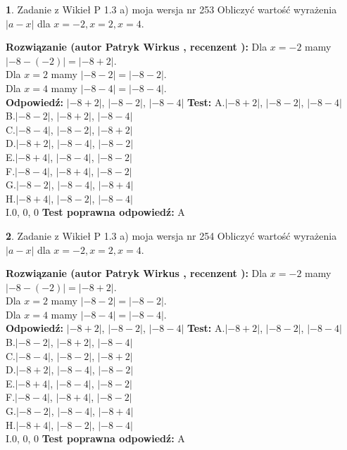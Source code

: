 \documentclass[12pt, a4paper]{article}
\theoremstyle{definition} %
\newtheorem{zad}{}
\newcommand{\zadStart}[1]{\begin{zad}#1\newline}
\newcommand{\zadStop}{\end{zad}}
\newcommand{\rozwStart}[2]{\noindent \textbf{Rozwiązanie (autor #1 , recenzent #2): }\newline}
\newcommand{\rozwStop}{\newline}
\newcommand{\odpStart}{\noindent \textbf{Odpowiedź:}\newline}
\newcommand{\odpStop}{\newline}
\newcommand{\testStart}{\noindent \textbf{Test:}\newline}
\newcommand{\testStop}{\newline}
\newcommand{\kluczStart}{\noindent \textbf{Test poprawna odpowiedź:}\newline}
\newcommand{\kluczStop}{\newline}
\begin{document}
\zadStart{Zadanie z Wikieł P 1.3 a) moja wersja nr 253}
Obliczyć wartość wyrażenia $|a - x|$ dla $x=-2,x=2,x=4$.
\zadStop
\rozwStart{Patryk Wirkus}{}
Dla $x = -2$ mamy $|-8 - (-2)| = |-8 + 2|$.\\
Dla $x = 2$ mamy $|-8 - 2| = |-8 - 2|$.\\
Dla $x = 4$ mamy $|-8 - 4| = |-8 - 4|$.\\
\rozwStop
\odpStart
$|-8 + 2|$, $|-8 - 2|$, $|-8 - 4|$
\odpStop
\testStart
A.$|-8 + 2|$, $|-8 - 2|$, $|-8 - 4|$\\
B.$|-8 - 2|$, $|-8 + 2|$, $|-8 - 4|$\\
C.$|-8 - 4|$, $|-8 - 2|$, $|-8 + 2|$\\
D.$|-8 + 2|$, $|-8 - 4|$, $|-8 - 2|$\\
E.$|-8 + 4|$, $|-8 - 4|$, $|-8 - 2|$\\
F.$|-8 - 4|$, $|-8 + 4|$, $|-8 - 2|$\\
G.$|-8 - 2|$, $|-8 - 4|$, $|-8 + 4|$\\
H.$|-8 + 4|$, $|-8 - 2|$, $|-8 - 4|$\\
I.$0$, $0$, $0$
\testStop
\kluczStart
A
\kluczStop



\zadStart{Zadanie z Wikieł P 1.3 a) moja wersja nr 254}
Obliczyć wartość wyrażenia $|a - x|$ dla $x=-2,x=2,x=4$.
\zadStop
\rozwStart{Patryk Wirkus}{}
Dla $x = -2$ mamy $|-8 - (-2)| = |-8 + 2|$.\\
Dla $x = 2$ mamy $|-8 - 2| = |-8 - 2|$.\\
Dla $x = 4$ mamy $|-8 - 4| = |-8 - 4|$.\\
\rozwStop
\odpStart
$|-8 + 2|$, $|-8 - 2|$, $|-8 - 4|$
\odpStop
\testStart
A.$|-8 + 2|$, $|-8 - 2|$, $|-8 - 4|$\\
B.$|-8 - 2|$, $|-8 + 2|$, $|-8 - 4|$\\
C.$|-8 - 4|$, $|-8 - 2|$, $|-8 + 2|$\\
D.$|-8 + 2|$, $|-8 - 4|$, $|-8 - 2|$\\
E.$|-8 + 4|$, $|-8 - 4|$, $|-8 - 2|$\\
F.$|-8 - 4|$, $|-8 + 4|$, $|-8 - 2|$\\
G.$|-8 - 2|$, $|-8 - 4|$, $|-8 + 4|$\\
H.$|-8 + 4|$, $|-8 - 2|$, $|-8 - 4|$\\
I.$0$, $0$, $0$
\testStop
\kluczStart
A
\kluczStop
\end{document}
